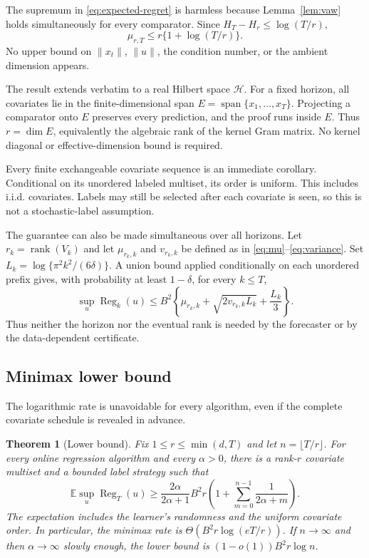 \documentclass[twoside]{article}
\newtheorem{theorem}{Theorem}
\newcommand{\E}{\mathbb E}
\newcommand{\cH}{\mathcal H}
\newcommand{\rank}{\operatorname{rank}}
\newcommand{\Reg}{\operatorname{Reg}}
\begin{document}
The supremum in \eqref{eq:expected-regret} is harmless because Lemma~\ref{lem:vaw} holds simultaneously for every comparator. Since $H_T-H_r\le\log(T/r)$,
\[
 \mu_{r,T}\le r\{1+\log(T/r)\}.
\]
No upper bound on $\|x_t\|$, $\|u\|$, the condition number, or the ambient dimension appears.

The result extends verbatim to a real Hilbert space $\cH$. For a fixed horizon, all covariates lie in the finite-dimensional span $E=\operatorname{span}\{x_1,\ldots,x_T\}$. Projecting a comparator onto $E$ preserves every prediction, and the proof runs inside $E$. Thus $r=\dim E$, equivalently the algebraic rank of the kernel Gram matrix. No kernel diagonal or effective-dimension bound is required.

Every finite exchangeable covariate sequence is an immediate corollary. Conditional on its unordered labeled multiset, its order is uniform. This includes i.i.d. covariates. Labels may still be selected after each covariate is seen, so this is not a stochastic-label assumption.

The guarantee can also be made simultaneous over all horizons. Let
$r_k=\rank(V_k)$ and let $\mu_{r_k,k}$ and $v_{r_k,k}$ be defined as in
\eqref{eq:mu}--\eqref{eq:variance}. Set
$L_k=\log\{\pi^2k^2/(6\delta)\}$. A union bound applied conditionally on each unordered prefix gives, with probability at least $1-\delta$, for every $k\le T$,
\begin{equation}
 \sup_u\Reg_k(u)\le B^2\left\{\mu_{r_k,k}
 +\sqrt{2v_{r_k,k}L_k}+\frac{L_k}{3}\right\}.
 \label{eq:anytime}
\end{equation}
Thus neither the horizon nor the eventual rank is needed by the forecaster or by the data-dependent certificate.

\subsection{Minimax lower bound}

The logarithmic rate is unavoidable for every algorithm, even if the complete covariate schedule is revealed in advance.

\begin{theorem}[Lower bound]
\label{thm:lower}
Fix $1\le r\le\min(d,T)$ and let $n=\lfloor T/r\rfloor$. For every online regression algorithm and every $\alpha>0$, there is a rank-$r$ covariate multiset and a bounded label strategy such that
\begin{equation}
 \E\sup_u\Reg_T(u)
 \ge \frac{2\alpha}{2\alpha+1}B^2r
 \left(1+\sum_{m=0}^{n-1}\frac1{2\alpha+m}\right).
 \label{eq:lower}
\end{equation}
The expectation includes the learner's randomness and the uniform covariate order. In particular, the minimax rate is
$\Theta(B^2r\log(eT/r))$. If $n\to\infty$ and then $\alpha\to\infty$ slowly enough, the lower bound is
$(1-o(1))B^2r\log n$.
\end{theorem}
\end{document}
